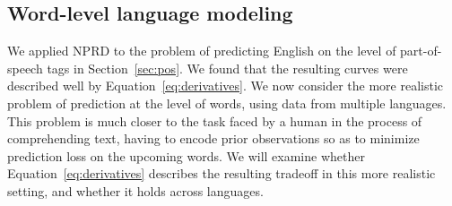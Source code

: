 \documentclass[entropy,article,submit,moreauthors,pdftex,10pt,a4paper]{Definitions/mdpi}
\newcommand{\past}{\overleftarrow{X}}
\let\oldequation\equation
\let\oldendequation\endequation
\renewenvironment{equation}
  {\linenomathNonumbers\oldequation}
  {\oldendequation\endlinenomath}
\begin{document}


\subsection{Word-level language modeling}\label{sec:words}


We applied NPRD to the problem of predicting English on the level of part-of-speech tags in Section~\ref{sec:pos}.
We found that the resulting curves were described well by Equation~\ref{eq:derivatives}.
We now consider the more realistic problem of prediction at the level of words, using data from multiple languages.
This problem is much closer to the task faced by a human in the process of comprehending text, having to encode prior observations so as to minimize prediction loss on the upcoming words.
We will examine whether Equation~\ref{eq:derivatives} describes the resulting tradeoff in this more realistic setting, and whether it holds across languages.
\end{document}
